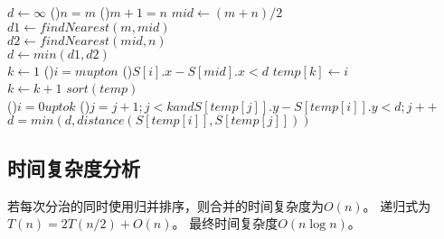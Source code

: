 \begin{algorithm}
    \caption{$findNearest(S[1..n])$}\label{algo:findNearest}
    $d \leftarrow \infty$
    \If(){$n=m$}{
    }
    \If(){$m+1=n$}{
    }
    $mid \leftarrow (m+n)/2 $\\
    $d1 \leftarrow findNearest(m,mid)$\\
    $d2 \leftarrow findNearest(mid, n)$\\
    $d \leftarrow min(d1, d2)$\\
    $k \leftarrow 1$ 
    \For(){$i = m up to n$}{
        \If(){$S[i].x-S[mid].x < d$}{
            $temp[k] \leftarrow i$\\
            $k \leftarrow k+1$
        }
    }
    $sort(temp)$\\
    \For(){$i= 0 up to k$}{
        \For(){$j=j+1; j<k and S[temp[j]].y - S[temp[i]].y < d; j++$}{
            $d=min(d, distance(S[temp[i]], S[temp[j]]))$
        }
    }
    

\end{algorithm}


\subsection*{时间复杂度分析}

若每次分治的同时使用归并排序，则合并的时间复杂度为$O(n)$。
递归式为$T(n)=2T(n/2) + O(n)$。
最终时间复杂度$O(n \log n)$。